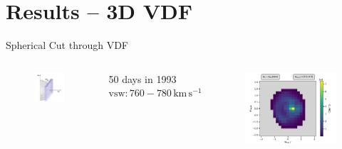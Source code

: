 \documentclass{beamer}
\begin{document}
\section{Results -- 3D VDF}
\begin{frame}{Spherical Cut through VDF}
\begin{columns}
	\column{2.5cm}
\begin{figure}
	\includegraphics[scale=.7]{Pics/slice_R2.pdf}
\end{figure}
{\scriptsize 50 days in 1993 \\
 $\mathrm{vsw} : 760 - 780 \, \mathrm{km\,s^{-1}}$
}
\column{7.5cm}
\begin{figure}
	\includegraphics[scale=.5]{Pics/cart_50_counts_R.pdf}
\end{figure}
\end{columns}
\end{frame}
\end{document}
